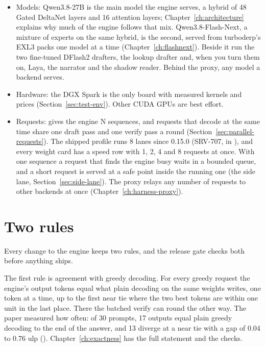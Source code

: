 \begin{itemize}
\item Models: Qwen3.8-27B is the main model the engine serves, a hybrid of 48 Gated DeltaNet layers and 16 attention layers; Chapter~\ref{ch:architecture} explains why much of the engine follows that mix. Qwen3.8-Flash-Next, a mixture of experts on the same hybrid, is the second, served from turboderp's EXL3 packs one model at a time (Chapter~\ref{ch:flashnext}). Beside it run the two fine-tuned DFlash2 drafters, the lookup drafter and, when you turn them on, Laya, the narrator and the shadow reader. Behind the proxy, any model a backend serves.
\item Hardware: the DGX Spark is the only board with measured kernels and prices (Section~\ref{sec:test-env}). Other CUDA GPUs are best effort.
\item Requests:  gives the engine N sequences, and requests that decode at the same time share one draft pass and one verify pass a round (Section~\ref{sec:parallel-requests}). The shipped profile runs 8 lanes since 0.15.0 (SRV-707,  in ), and every weight card has a speed row with 1, 2, 4 and 8 requests at once. With one sequence a request that finds the engine busy waits in a bounded queue, and a short request is served at a safe point inside the running one (the side lane, Section~\ref{sec:side-lane}). The proxy relays any number of requests to other backends at once (Chapter~\ref{ch:harness-proxy}).
\end{itemize}

\section{Two rules}

Every change to the engine keeps two rules, and the release gate checks both before anything ships.

The first rule is agreement with greedy decoding. For every greedy request the engine's output tokens equal what plain decoding on the same weights writes, one token at a time, up to the first near tie where the two best tokens are within one unit in the last place. There the batched verify can round the other way. The paper measured how often: of 30 prompts, 17 outputs equal plain greedy decoding to the end of the answer, and 13 diverge at a near tie with a gap of 0.04 to 0.76 ulp (\measured). Chapter~\ref{ch:exactness} has the full statement and the checks.

